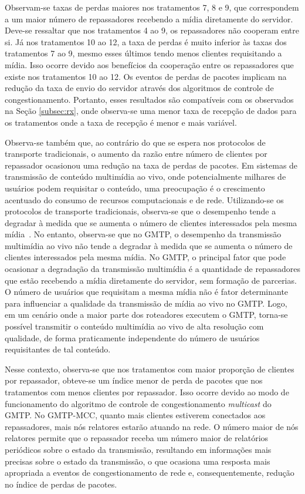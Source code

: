 Observam-se taxas de perdas maiores nos tratamentos 7, 8 e 9, que correspondem a um maior número de repassadores recebendo a mídia diretamente do servidor. Deve-se ressaltar que nos tratamentos 4 ao 9, os repassadores não cooperam entre si.
Já nos tratamentos 10 ao 12, a taxa de perdas é muito inferior às taxas dos tratamentos 7 ao 9, mesmo esses últimos tendo menos clientes requisitando a mídia. Isso ocorre devido aos benefícios da cooperação entre os repassadores que existe nos tratamentos 10 ao 12.
Os eventos de perdas de pacotes implicam na redução da taxa de envio do servidor através dos algoritmos de controle de congestionamento. Portanto, esses resultados são compatíveis com os observados na Seção \ref{subsec:rx}, onde observa-se uma menor taxa de recepção de dados para os tratamentos onde a taxa de recepção é menor e mais variável.

Observa-se também que, ao contrário do que se espera nos protocolos de transporte tradicionais, o aumento da razão entre número de clientes por repassador ocasionou uma redução na taxa de perdas de pacotes. 
Em sistemas de transmissão de conteúdo multimídia ao vivo, onde potencialmente milhares de usuários podem requisitar o conteúdo, uma preocupação é o crescimento acentuado do consumo de recursos computacionais e de rede. Utilizando-se os protocolos de transporte tradicionais, observa-se que o desempenho tende a degradar à medida que se aumenta o número de clientes interessados pela mesma mídia~\cite{sales2014gmtp}.
No entanto, observa-se que no GMTP, o desempenho da transmissão multimídia ao vivo não tende a degradar à medida que se aumenta o número de clientes interessados pela mesma mídia. 
No GMTP, o principal fator que pode ocasionar a degradação da transmissão multimídia é a quantidade de repassadores que estão recebendo a mídia diretamente do servidor, sem formação de parcerias. O número de usuários que requisitam a mesma mídia não é fator determinante para influenciar a qualidade da transmissão de mídia ao vivo no GMTP.
Logo, em um cenário onde a maior parte dos roteadores executem o GMTP, torna-se possível transmitir o conteúdo multimídia ao vivo de alta resolução com qualidade, de forma praticamente independente do número de usuários requisitantes de tal conteúdo.

Nesse contexto, observa-se que nos tratamentos com maior proporção de clientes por repassador, obteve-se um índice menor de perda de pacotes que nos tratamentos com menos clientes por repassador.
Isso ocorre devido ao modo de funcionamento do algoritmo de controle de congestionamento \textit{multicast} do GMTP. 
No GMTP-MCC, quanto mais clientes estiverem conectados aos repassadores, mais nós relatores estarão atuando na rede. O número maior de nós relatores permite que o repassador receba um número maior de relatórios periódicos sobre o estado da transmissão, resultando em informações mais precisas sobre o estado da transmissão, o que ocasiona uma resposta mais apropriada a eventos de congestionamento de rede e, consequentemente, redução no índice de perdas de pacotes.

